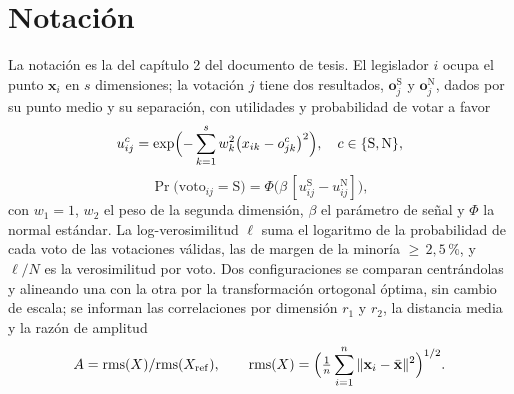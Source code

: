 \section*{Notación}
La notación es la del capítulo 2 del documento de tesis. El legislador $i$
ocupa el punto $\mathbf{x}_i$ en $s$ dimensiones; la votación $j$ tiene dos resultados,
$\mathbf{o}_j^{\mathrm{S}}$ y $\mathbf{o}_j^{\mathrm{N}}$, dados por su punto medio y su
separación, con utilidades y probabilidad de votar a favor
\begin{equation}
u_{ij}^{c} = \exp\Bigl(-\sum_{k=1}^{s} w_k^{2} \bigl(x_{ik} - o_{jk}^{c}\bigr)^{2}\Bigr),
\quad c \in \{\mathrm{S}, \mathrm{N}\},
\label{eq:util}
\end{equation}
\begin{equation}
\Pr\bigl(\mathrm{voto}_{ij} = \mathrm{S}\bigr) = \Phi\bigl(\beta \,[u_{ij}^{\mathrm{S}} - u_{ij}^{\mathrm{N}}]\bigr),
\label{eq:prob}
\end{equation}
con $w_1 = 1$, $w_2$ el peso de la segunda dimensión, $\beta$ el parámetro de señal y $\Phi$
la normal estándar. La log-verosimilitud $\ell$ suma el logaritmo de la probabilidad de cada
voto de las votaciones válidas, las de margen de la minoría ${\ge}\,2{,}5$\,\%, y $\ell/N$ es la
verosimilitud por voto. Dos
configuraciones se comparan centrándolas y alineando una con la otra por la transformación
ortogonal óptima, sin cambio de escala; se informan las correlaciones por dimensión $r_1$ y
$r_2$, la distancia media y la razón de amplitud
\begin{equation}
A = \mathrm{rms}(X)/\mathrm{rms}(X_{\mathrm{ref}}), \qquad
\mathrm{rms}(X) = \Bigl({\textstyle\frac{1}{n}} \sum_{i=1}^{n} \Vert \mathbf{x}_i - \bar{\mathbf{x}} \Vert^{2}\Bigr)^{1/2}.
\label{eq:amplitud}
\end{equation}


